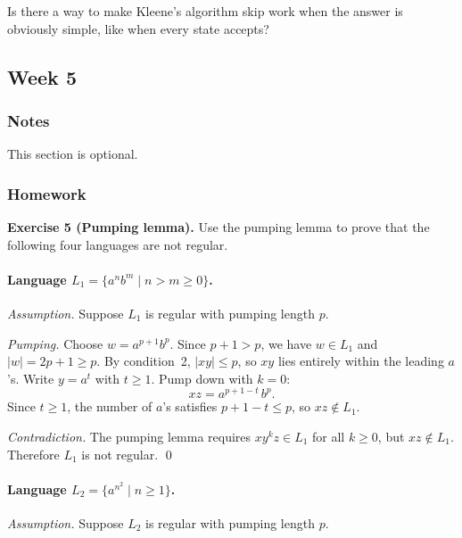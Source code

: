\documentclass{article}
\theoremstyle{theorem}
\theoremstyle{definition}
\theoremstyle{remark}
\begin{document}
Is there a way to make Kleene's algorithm skip work when the answer is obviously simple, like when every state accepts?
















\subsection{Week 5}

\subsubsection{Notes}

This section is optional. 

\subsubsection{Homework}

\textbf{Exercise 5 (Pumping lemma).} Use the pumping lemma to prove that the following four languages are not regular.

\paragraph{Language $L_1 = \{a^n b^m \mid n > m \geq 0\}$.}

\emph{Assumption.} Suppose $L_1$ is regular with pumping length $p$.

\emph{Pumping.} Choose $w = a^{p+1} b^p$. Since $p+1 > p$, we have $w \in L_1$ and $|w| = 2p+1 \geq p$. By condition~2, $|xy| \leq p$, so $xy$ lies entirely within the leading $a$'s. Write $y = a^t$ with $t \geq 1$. Pump down with $k = 0$:
\[
  xz = a^{p+1-t}\, b^p.
\]
Since $t \geq 1$, the number of $a$'s satisfies $p+1-t \leq p$, so $xz \notin L_1$.

\emph{Contradiction.} The pumping lemma requires $xy^k z \in L_1$ for all $k \geq 0$, but $xz \notin L_1$. Therefore $L_1$ is not regular. \qed

\paragraph{Language $L_2 = \{a^{n^2} \mid n \geq 1\}$.}

\emph{Assumption.} Suppose $L_2$ is regular with pumping length $p$.
\end{document}
